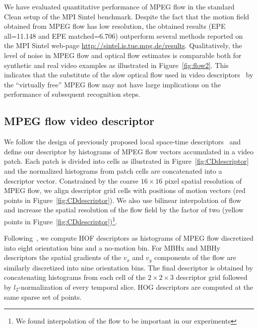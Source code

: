 \documentclass[10pt,twocolumn,letterpaper]{article}
\begin{document}
We have evaluated quantitative performance of MPEG flow in the standard Clean setup of the MPI Sintel benchmark. Despite the fact that the motion field obtained from MPEG flow has low resolution, the obtained results (EPE all=11.148 and EPE matched=6.706) outperform several methods reported on the MPI Sintel web-page {\small \url{http://sintel.is.tue.mpg.de/results}}. Qualitatively, the level of noise in MPEG flow and optical flow estimates is comparable both for synthetic and real video examples as illustrated in Figure~\ref{fig:flow2}. This indicates that the substitute of the slow optical flow used in video descriptors~\cite{Laptev08,Wang12} by the ``virtually free'' MPEG flow may not have large implications on the performance of subsequent recognition steps.





%
%




\subsection{MPEG flow video descriptor}
\label{sec:CDdescriptor}

We follow the design of previously proposed local space-time descriptors~\cite{Laptev08,Wang12} and define our descriptor by histograms of MPEG flow vectors accumulated in a video patch. Each patch is divided into cells as illustrated in Figure~\ref{fig:CDdescriptor} and the normalized histograms from patch cells are concatenated into a descriptor vector. Constrained by the coarse $16\times16$ pixel spatial resolution of MPEG flow, we align descriptor grid cells with positions of motion vectors (red points in Figure~\ref{fig:CDdescriptor}). We also use bilinear interpolation of flow and increase the spatial resolution of the flow field by the factor of two (yellow points in Figure~\ref{fig:CDdescriptor})\footnote{We found interpolation of the flow to be important in our experiments}. 

Following~\cite{Wang12}, we compute HOF descriptors as histograms of MPEG flow discretized into eight orientation bins and a no-motion bin. For MBHx and MBHy descriptors the spatial gradients of the $v_x$ and $v_y$ components of the flow are similarly discretized into nine orientation bins. %
The final descriptor is obtained by concatenating histograms from each cell of the $2\times2\times3$ descriptor grid followed by $l_2$-normalization of every temporal slice. HOG descriptors are computed at the same sparse set of points.
\end{document}
